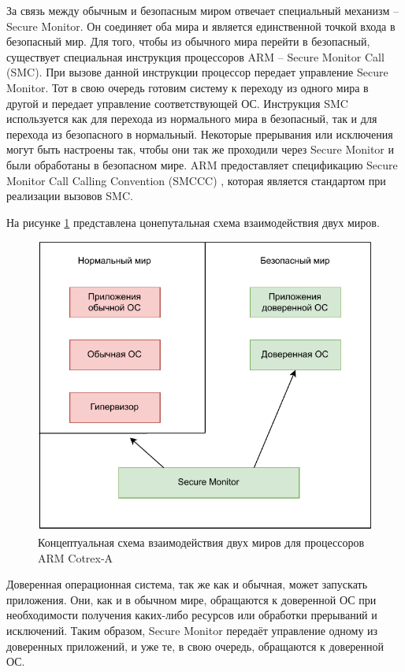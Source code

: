 За связь между обычным и безопасным миром отвечает специальный механизм -- Secure Monitor. Он соединяет оба мира и является единственной точкой входа в безопасный мир. Для того, чтобы из обычного мира перейти в безопасный, существует специальная инструкция процессоров ARM -- Secure Monitor Call (SMC). При вызове данной инструкции процессор передает управление Secure Monitor. Тот в свою очередь готовим систему к переходу из одного мира в другой и передает управление соответствующей ОС. Инструкция SMC используется как для перехода из нормального мира в безопасный, так и для перехода из безопасного в нормальный. Некоторые прерывания или исключения могут быть настроены так, чтобы они так же проходили через Secure Monitor и были обработаны в безопасном мире. ARM предоставляет спецификацию Secure Monitor Call Calling Convention (SMCCC) \cite{smccc}, которая является стандартом при реализации вызовов SMC. 

На рисунке \ref{fig:trustzone-conceptual} представлена цонепутальная схема взаимодействия двух миров.

\begin{figure}[h]
	\centering
	\includegraphics[width=\textwidth]{img/arm-conceptual.pdf}
	\caption{Концептуальная схема взаимодействия двух миров для процессоров ARM Cotrex-A}
	\label{fig:trustzone-conceptual}
\end{figure}

Доверенная операционная система, так же как и обычная, может запускать приложения. Они, как и в обычном мире, обращаются к доверенной ОС при необходимости получения каких-либо ресурсов или обработки прерываний и исключений. Таким образом, Secure Monitor передаёт управление одному из доверенных приложений, и уже те, в свою очередь, обращаются к доверенной ОС.

